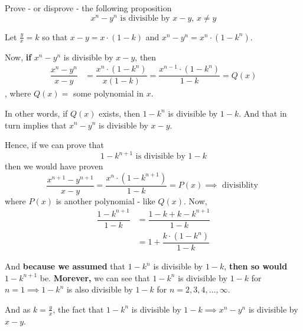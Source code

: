 
\question Prove - or disprove - the following proposition
\[ x^n - y^n \text{ is divisible by } x - y,\, x\neq y\]

\insertQR{}

\begin{solution}
  Let $\frac{y}{x}=k$ so that $x-y = x\cdot(1-k)$ and $x^n-y^n=x^n\cdot (1-k^n)$.

  Now, \textbf{if} $x^n-y^n$ is divisible by $x-y$, then 
  \begin{align}
    \dfrac{x^n-y^n}{x-y} &= \dfrac{x^n\cdot(1-k^n)}{x(1-k)} = \dfrac{x^{n-1}\cdot(1-k^n)}{1-k} = Q(x)
  \end{align}
  , where $Q(x) = $ some polynomial in $x$. 
  
  In other words, if $Q(x)$ exists, then  $1-k^n$ is divisible by $1-k$. And that in turn implies 
  that $x^n-y^n$ is divisible by $x-y$.

  Hence, if we can prove that 
  \[ 1-k^{n+1} \text{ is divisible by } 1-k \]
  then we would have proven 
  \[ \dfrac{x^{n+1} - y^{n+1}}{x-y} = \dfrac{x^n\cdot(1-k^{n+1})}{1-k} = P(x)\implies\text{ divisiblity }\]
  where $P(x)$ is another polynomial - like $Q(x)$. Now, 
  \begin{align}
    \dfrac{1-k^{n+1}}{1-k} &= \dfrac{1-k + k - k^{n+1}}{1-k} \\
      &= 1 + \dfrac{k\cdot (1-k^n)}{1-k}
  \end{align}

  And \textbf{ because we assumed } that $1-k^n$ is divisible by $1-k$, \textbf{ then so would } $1-k^{n+1}$ be. 
  \textbf{Morever,} we can see that $1-k^n$ is divisible by $1-k$ for $n=1\implies 1-k^n$ is also 
  divisible by $1-k$ for $n=2,3,4,\ldots,\infty$. 

  And as $k=\frac{y}{x}$, the fact that $1-k^n$ is divisible by $1-k\implies x^n-y^n$ is divisible by $x-y$.
\end{solution}

